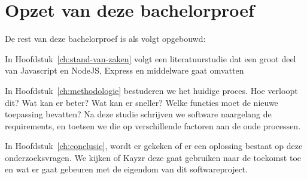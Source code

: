 \section{Opzet van deze bachelorproef}
\label{sec:opzet-bachelorproef}


De rest van deze bachelorproef is als volgt opgebouwd:

In Hoofdstuk~\ref{ch:stand-van-zaken} volgt een literatuurstudie dat een groot deel van Javascript en NodeJS, Express en middelware gaat omvatten

In Hoofdstuk~\ref{ch:methodologie} bestuderen we het huidige proces. Hoe verloopt dit? Wat kan er beter? Wat kan er sneller? Welke functies moet de nieuwe toepassing bevatten? Na deze studie schrijven we software naargelang de requirements, en toetsen we die op verschillende factoren aan de oude processen.


In Hoofdstuk~\ref{ch:conclusie}, wordt er gekeken of er een oplossing bestaat op deze onderzoeksvragen. We kijken of Kayzr deze gaat gebruiken naar de toekomst toe en wat er gaat gebeuren met de eigendom van dit softwareproject.

